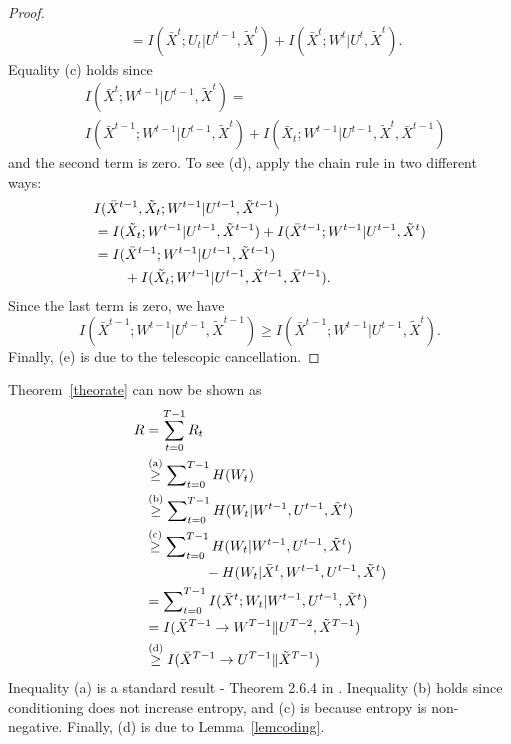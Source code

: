 \begin{proof}
\begin{align*}
&=I(\bar{X}^t; U_t|U^{t-1}, \tilde{X}^t)+I(\bar{X}^t;W^t|U^t, \tilde{X}^t).
\end{align*}
Equality (c) holds since
\begin{align*}
&I(\bar{X}^t; W^{t-1}|U^{t-1}, \tilde{X}^t)=\\
&I(\bar{X}^{t-1}; W^{t-1}|U^{t-1}, \tilde{X}^t)+I(\bar{X}_t; W^{t-1}|U^{t-1}, \tilde{X}^t, \bar{X}^{t-1})
\end{align*}
and the second term is zero. To see (d), apply the chain rule in two different ways:
\begin{align*}
&I(\bar{X}^{t-1}, \tilde{X}_t; W^{t-1}|U^{t-1},\tilde{X}^{t-1}) \\
&=I(\tilde{X}_t; W^{t-1}|U^{t-1}, \tilde{X}^{t-1})+I(\bar{X}^{t-1}; W^{t-1}|U^{t-1}, \tilde{X}^t) \\
&=I(\bar{X}^{t-1}; W^{t-1}|U^{t-1}, \tilde{X}^{t-1}) \\
&\hspace{5ex}+I(\tilde{X}_t;W^{t-1}|U^{t-1},\tilde{X}^{t-1}, \bar{X}^{t-1}).
\end{align*}
Since the last term is zero, we have 
\[
I(\bar{X}^{t-1}; W^{t-1}|U^{t-1}, \tilde{X}^{t-1}) \geq I(\bar{X}^{t-1}; W^{t-1}|U^{t-1}, \tilde{X}^t).
\]
Finally, (e) is due to the telescopic cancellation.
\end{proof}

Theorem~\ref{theorate} can now be shown as
\begin{align*}
R&=\sum_{t=0}^{T-1} R_t \\
&\stackrel{\text{(a)}}{\geq} \sum\nolimits_{t=0}^{T-1} H(W_t) \\
&\stackrel{\text{(b)}}{\geq} \sum\nolimits_{t=0}^{T-1} H(W_t|W^{t-1}, U^{t-1}, \tilde{X}^t) \\
&\stackrel{\text{(c)}}{\geq} \sum\nolimits_{t=0}^{T-1} H(W_t|W^{t-1}, U^{t-1}, \tilde{X}^t) \\
&\hspace{10ex}-H(W_t|\bar{X}^t, W^{t-1}, U^{t-1}, \tilde{X}^t) \\
&=\sum\nolimits_{t=0}^{T-1} I(\bar{X}^t; W_t|W^{t-1}, U^{t-1}, \tilde{X}^t) \\
&=I(\bar{X}^{T-1}\rightarrow W^{T-1}\| U^{T-2}, \tilde{X}^{T-1}) \\
&\stackrel{\text{(d)}}{\geq} I(\bar{X}^{T-1}\rightarrow U^{T-1}\| \tilde{X}^{T-1})
\end{align*}
Inequality (a) is a standard result - Theorem 2.6.4 in \cite{cover2012elements}. Inequality (b) holds since conditioning does not increase entropy, and (c) is because entropy is non-negative. Finally, (d) is due to Lemma~\ref{lemcoding}.

